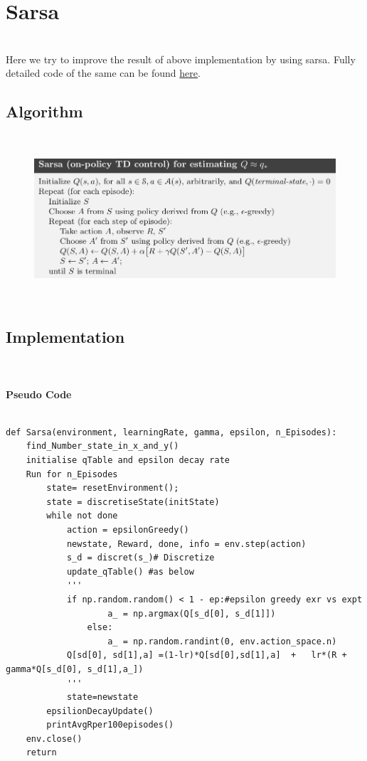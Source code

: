 \newline \section{Sarsa}\\
Here we try to improve the result of above implementation by using sarsa. Fully detailed code of the same can be found \href{https://github.com/iamrajee/Slam_and_RL_BTP/tree/master/code/AI/mountainCar/sarsa}{here}.
\newline \subsection{Algorithm}\\
\begin{figure}[H]
    \centering
    \includegraphics[width=\textwidth]{images/sarsa.png}
\end{figure}\\

\subsection{Implementation}\\
\\
\textbf{Pseudo Code}
\begin{verbatim}

def Sarsa(environment, learningRate, gamma, epsilon, n_Episodes):
    find_Number_state_in_x_and_y()
    initialise qTable and epsilon decay rate
    Run for n_Episodes
        state= resetEnvironment();
        state = discretiseState(initState)
        while not done
            action = epsilonGreedy() 
            newstate, Reward, done, info = env.step(action) 
            s_d = discret(s_)# Discretize
            update_qTable() #as below
            '''
            if np.random.random() < 1 - ep:#epsilon greedy exr vs expt
                    a_ = np.argmax(Q[s_d[0], s_d[1]])
                else:
                    a_ = np.random.randint(0, env.action_space.n)
            Q[sd[0], sd[1],a] =(1-lr)*Q[sd[0],sd[1],a]  +   lr*(R + gamma*Q[s_d[0], s_d[1],a_])
            '''
            state=newstate
        epsilionDecayUpdate()
        printAvgRper100episodes()
    env.close()
    return
\end{verbatim}\\

